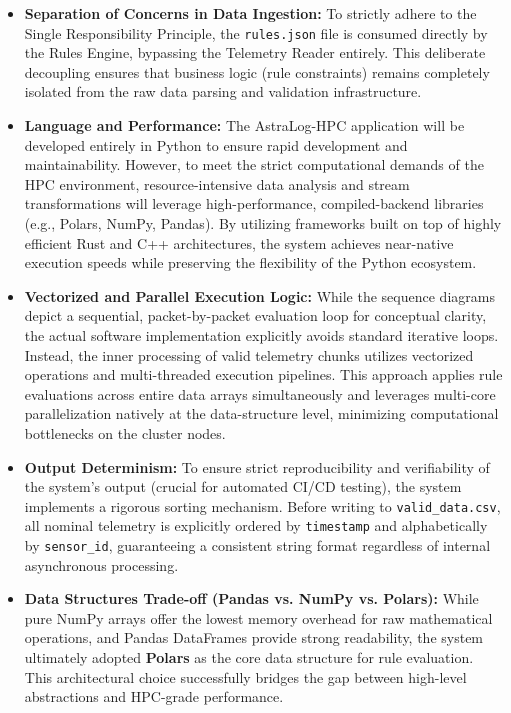 \documentclass[11pt, a4paper]{article}
\begin{document}
\begin{itemize}
    \item \textbf{Separation of Concerns in Data Ingestion:} To strictly adhere to the Single Responsibility Principle, the \texttt{rules.json} file is consumed directly by the Rules Engine, bypassing the Telemetry Reader entirely. This deliberate decoupling ensures that business logic (rule constraints) remains completely isolated from the raw data parsing and validation infrastructure.

    \item \textbf{Language and Performance:} The AstraLog-HPC application will be developed entirely in Python to ensure rapid development and maintainability. However, to meet the strict computational demands of the HPC environment, resource-intensive data analysis and stream transformations will leverage high-performance, compiled-backend libraries (e.g., Polars, NumPy, Pandas). By utilizing frameworks built on top of highly efficient Rust and C++ architectures, the system achieves near-native execution speeds while preserving the flexibility of the Python ecosystem.

    \item \textbf{Vectorized and Parallel Execution Logic:} While the sequence diagrams depict a sequential, packet-by-packet evaluation loop for conceptual clarity, the actual software implementation explicitly avoids standard iterative loops. Instead, the inner processing of valid telemetry chunks utilizes vectorized operations and multi-threaded execution pipelines. This approach applies rule evaluations across entire data arrays simultaneously and leverages multi-core parallelization natively at the data-structure level, minimizing computational bottlenecks on the cluster nodes.

    \item \textbf{Output Determinism:} To ensure strict reproducibility and verifiability of the system's output (crucial for automated CI/CD testing), the system implements a rigorous sorting mechanism. Before writing to \texttt{valid\_data.csv}, all nominal telemetry is explicitly ordered by \texttt{timestamp} and alphabetically by \texttt{sensor\_id}, guaranteeing a consistent string format regardless of internal asynchronous processing.

    \item \textbf{Data Structures Trade-off (Pandas vs. NumPy vs. Polars):}
    While pure NumPy arrays offer the lowest memory overhead for raw mathematical operations, and Pandas DataFrames provide strong readability, the system ultimately adopted \textbf{Polars} as the core data structure for rule evaluation. This architectural choice successfully bridges the gap between high-level abstractions and HPC-grade performance.


\end{itemize}
\end{document}
